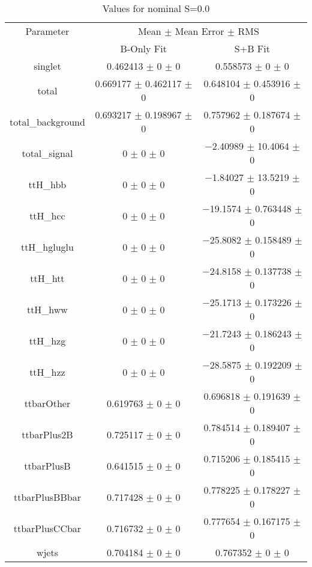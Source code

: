\begin{table}
\centering
\caption{Values for nominal S=0.0}
\begin{tabular}{ccc}
\toprule
Parameter & \multicolumn{2}{c}{Mean $\pm$ Mean Error $\pm$ RMS}\\
 & B-Only Fit & S+B Fit\\
\midrule
singlet & \num{0.462413} $\pm$ \num{0} $\pm$ \num{0} & \num{0.558573} $\pm$ \num{0} $\pm$ \num{0}\\
total & \num{0.669177} $\pm$ \num{0.462117} $\pm$ \num{0} & \num{0.648104} $\pm$ \num{0.453916} $\pm$ \num{0}\\
total\_background & \num{0.693217} $\pm$ \num{0.198967} $\pm$ \num{0} & \num{0.757962} $\pm$ \num{0.187674} $\pm$ \num{0}\\
total\_signal & \num{0} $\pm$ \num{0} $\pm$ \num{0} & \num{-2.40989} $\pm$ \num{10.4064} $\pm$ \num{0}\\
ttH\_hbb & \num{0} $\pm$ \num{0} $\pm$ \num{0} & \num{-1.84027} $\pm$ \num{13.5219} $\pm$ \num{0}\\
ttH\_hcc & \num{0} $\pm$ \num{0} $\pm$ \num{0} & \num{-19.1574} $\pm$ \num{0.763448} $\pm$ \num{0}\\
ttH\_hgluglu & \num{0} $\pm$ \num{0} $\pm$ \num{0} & \num{-25.8082} $\pm$ \num{0.158489} $\pm$ \num{0}\\
ttH\_htt & \num{0} $\pm$ \num{0} $\pm$ \num{0} & \num{-24.8158} $\pm$ \num{0.137738} $\pm$ \num{0}\\
ttH\_hww & \num{0} $\pm$ \num{0} $\pm$ \num{0} & \num{-25.1713} $\pm$ \num{0.173226} $\pm$ \num{0}\\
ttH\_hzg & \num{0} $\pm$ \num{0} $\pm$ \num{0} & \num{-21.7243} $\pm$ \num{0.186243} $\pm$ \num{0}\\
ttH\_hzz & \num{0} $\pm$ \num{0} $\pm$ \num{0} & \num{-28.5875} $\pm$ \num{0.192209} $\pm$ \num{0}\\
ttbarOther & \num{0.619763} $\pm$ \num{0} $\pm$ \num{0} & \num{0.696818} $\pm$ \num{0.191639} $\pm$ \num{0}\\
ttbarPlus2B & \num{0.725117} $\pm$ \num{0} $\pm$ \num{0} & \num{0.784514} $\pm$ \num{0.189407} $\pm$ \num{0}\\
ttbarPlusB & \num{0.641515} $\pm$ \num{0} $\pm$ \num{0} & \num{0.715206} $\pm$ \num{0.185415} $\pm$ \num{0}\\
ttbarPlusBBbar & \num{0.717428} $\pm$ \num{0} $\pm$ \num{0} & \num{0.778225} $\pm$ \num{0.178227} $\pm$ \num{0}\\
ttbarPlusCCbar & \num{0.716732} $\pm$ \num{0} $\pm$ \num{0} & \num{0.777654} $\pm$ \num{0.167175} $\pm$ \num{0}\\
wjets & \num{0.704184} $\pm$ \num{0} $\pm$ \num{0} & \num{0.767352} $\pm$ \num{0} $\pm$ \num{0}\\
\bottomrule
\end{tabular}
\end{table}